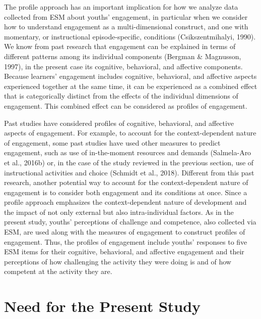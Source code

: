 \documentclass[]{book}
\theoremstyle{definition}
\theoremstyle{definition}
\theoremstyle{definition}
\theoremstyle{remark}
\begin{document}
The profile approach has an important implication for how we analyze
data collected from ESM about youths' engagement, in particular when we
consider how to understand engagement as a multi-dimensional construct,
and one with momentary, or instructional episode-specific, conditions
(Csikszentmihalyi, 1990). We know from past research that engagement can
be explained in terms of different patterns among its individual
components (Bergman \& Magnusson, 1997), in the present case its
cognitive, behavioral, and affective components. Because learners'
engagement includes cognitive, behavioral, and affective aspects
experienced together at the same time, it can be experienced as a
combined effect that is categorically distinct from the effects of the
individual dimensions of engagement. This combined effect can be
considered as profiles of engagement.

Past studies have considered profiles of cognitive, behavioral, and
affective aspects of engagement. For example, to account for the
context-dependent nature of engagement, some past studies have used
other measures to predict engagement, such as use of in-the-moment
resources and demands (Salmela-Aro et al., 2016b) or, in the case of the
study reviewed in the previous section, use of instructional activities
and choice (Schmidt et al., 2018). Different from this past research,
another potential way to account for the context-dependent nature of
engagement is to consider both engagement and its conditions at once.
Since a profile approach emphasizes the context-dependent nature of
development and the impact of not only external but also
intra-individual factors. As in the present study, youths' perceptions
of challenge and competence, also collected via ESM, are used along with
the measures of engagement to construct profiles of engagement. Thus,
the profiles of engagement include youths' responses to five ESM items
for their cognitive, behavioral, and affective engagement and their
perceptions of how challenging the activity they were doing is and of
how competent at the activity they are.

\section{Need for the Present Study}\label{need-for-the-present-study}
\end{document}
